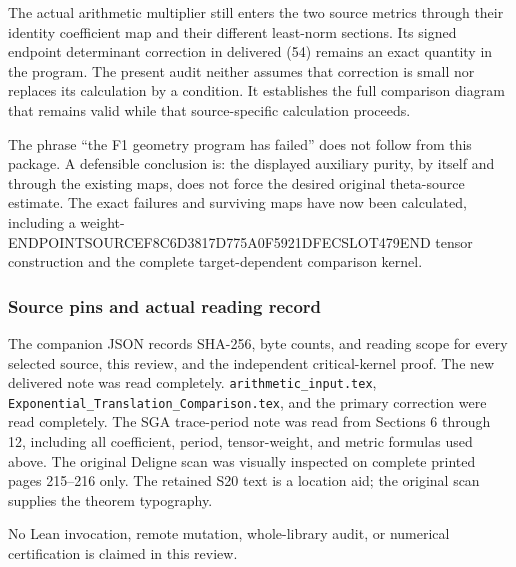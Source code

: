 The actual arithmetic multiplier still enters the two source metrics through their identity coefficient map and their different least-norm sections. Its signed endpoint determinant correction in delivered (54) remains an exact quantity in the program. The present audit neither assumes that correction is small nor replaces its calculation by a condition. It establishes the full comparison diagram that remains valid while that source-specific calculation proceeds.

The phrase ``the F1 geometry program has failed'' does not follow from this package. A defensible conclusion is: the displayed auxiliary purity, by itself and through the existing maps, does not force the desired original theta-source estimate. The exact failures and surviving maps have now been calculated, including a weight-ENDPOINTSOURCEF8C6D3817D775A0F5921DFECSLOT479END tensor construction and the complete target-dependent comparison kernel.

\subsubsection{Source pins and actual reading record}\label{endpoint-purity_review--source-pins-and-actual-reading-record}

The companion JSON records SHA-256, byte counts, and reading scope for every selected source, this review, and the independent critical-kernel proof. The new delivered note was read completely. \texttt{arithmetic\_input.tex}, \texttt{Exponential\_Translation\_Comparison.tex}, and the primary correction were read completely. The SGA trace-period note was read from Sections 6 through 12, including all coefficient, period, tensor-weight, and metric formulas used above. The original Deligne scan was visually inspected on complete printed pages 215--216 only. The retained S20 text is a location aid; the original scan supplies the theorem typography.

No Lean invocation, remote mutation, whole-library audit, or numerical certification is claimed in this review.
